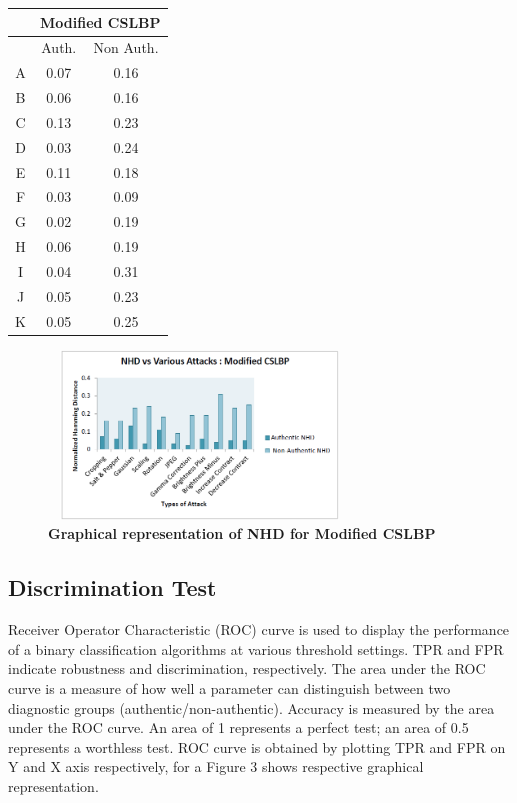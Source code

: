 \documentclass[12pt,a4paper]{jihmsp}
\begin{document}
{{\begin{table}[h]
\begin{tabular}{*3c}
		&  \multicolumn{2}{c}{Modified CSLBP} 
		\\
		\midrule
		{}   &  Auth.  &  Non Auth.       \\
		A	& 0.07	& 0.16 \\
		B	& 0.06	& 0.16 \\
		C	& 0.13	& 0.23 \\
		D	& 0.03	& 0.24 \\
		E	& 0.11	& 0.18 \\
		F	& 0.03	& 0.09 \\
		G	& 0.02	& 0.19 \\
		H	& 0.06	& 0.19 \\
		I	& 0.04	& 0.31 \\
		J	& 0.05	& 0.23 \\
		K	& 0.05	& 0.25 \\
		\bottomrule
	\end{tabular}
\end{table}
\begin{figure}
	\centering
	\includegraphics[width=80mm, height=45mm]{NHDproposedmethod.png}
	\caption{\textbf{Graphical representation of NHD for Modified CSLBP}}
\end{figure}

\subsection{Discrimination Test}
Receiver Operator Characteristic (ROC) curve is used to display the performance of a binary classification algorithms at various threshold settings. TPR and FPR indicate robustness and discrimination, respectively. The area under the ROC curve is a measure of how well a parameter can distinguish between two diagnostic groups (authentic/non-authentic). Accuracy is measured by the area under the ROC curve. An area of 1 represents a perfect test; an area of 0.5 represents a worthless test. ROC curve is obtained by plotting TPR and FPR on Y and X axis respectively, for a Figure 3 shows respective graphical representation.

}}
\end{document}
